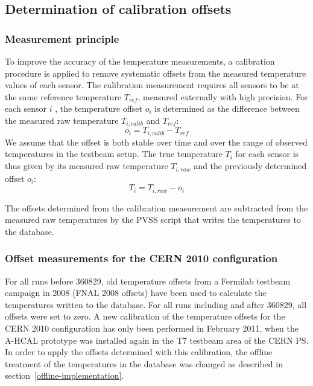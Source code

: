 \documentclass[a4paper,10pt]{article}
\begin{document}
\subsection{Determination of calibration offsets}
\label{offset-determination}
\subsubsection{Measurement principle}
To improve the accuracy of the temperature measurements, a calibration procedure is applied to remove
systematic offsets from the measured temperature values of each sensor. The calibration measurement 
requires all sensors to be at the same reference temperature $T_{ref}$, measured externally with 
high precision.  For each 
sensor $i$ , the temperature offset $o_{i}$ is determined as the difference between the 
measured raw temperature $T_{i,calib}$ and $T_{ref}$:
$$o_i=T_{i,calib}-T_{ref}$$
We assume that the offset is both stable over time and over the range of observed temperatures in the
testbeam setup. The true temperature $T_i$ for each sensor is thus given by its measured raw temperature 
$T_{i,raw}$ and the previously determined offset $o_i$: 
$$T_{i}=T_{i,raw}-o_i$$

The offsets determined from the calibration measurement are subtracted from the measured raw temperatures
by the PVSS script that writes the temperatures to the database. 

\subsubsection{Offset measurements for the CERN 2010 configuration}

For all runs before 360829, old temperature
offsets from a Fermilab testbeam campaign in 2008 (FNAL 2008 offsets) 
have been used to calculate the temperatures written 
to the database. For all runs including and after 360829, all offsets were set to zero. A new calibration
of the temperature offsets for the CERN 2010 configuration has only been performed in February 2011, 
when the A-HCAL prototype was installed again in the T7 testbeam area of the CERN PS. 
In order to apply the offsets determined with this calibration, the offline treatment of the
temperatures in the database was changed as described in section~\ref{offline-implementation}.
\end{document}
